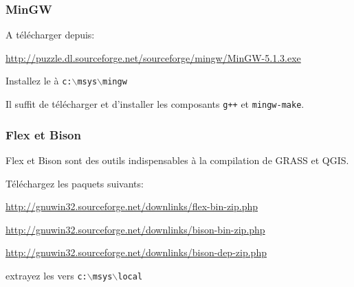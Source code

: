 \subsubsection{MinGW}
A télécharger depuis:

\url{http://puzzle.dl.sourceforge.net/sourceforge/mingw/MinGW-5.1.3.exe}

Installez le à \texttt{c:$\backslash$msys$\backslash$mingw}

Il suffit de télécharger et d'installer les composants \texttt{g++} et \texttt{mingw-make}.

% 
% 
% 
% 
% 

\subsubsection{Flex et Bison}
Flex et Bison sont des outils indispensables à la compilation de GRASS et QGIS. 

Téléchargez les paquets suivants:

\url{http://gnuwin32.sourceforge.net/downlinks/flex-bin-zip.php}

\url{http://gnuwin32.sourceforge.net/downlinks/bison-bin-zip.php}

\url{http://gnuwin32.sourceforge.net/downlinks/bison-dep-zip.php}

extrayez les vers \texttt{c:$\backslash$msys$\backslash$local}

